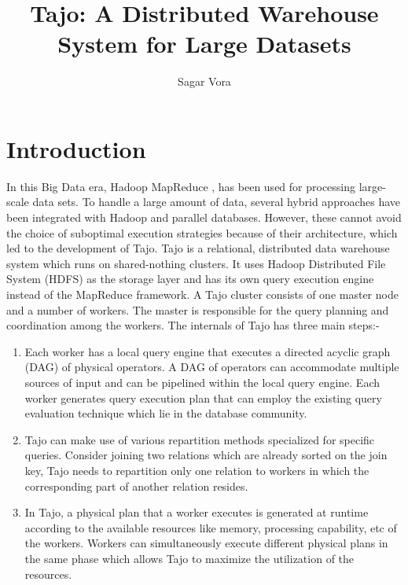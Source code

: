 \documentclass[9pt,twocolumn,twoside]{../../styles/osajnl}
\title{Tajo: A Distributed Warehouse System for Large Datasets}
\author[1]{Sagar Vora}
\affil[1]{School of Informatics and Computing, Bloomington, IN 47408, U.S.A.}
\begin{document}
\maketitle

\section{Introduction}
In this Big Data era, Hadoop \cite{www-apache-hadoop} MapReduce
\cite{mapreduce-article}, has been used for processing large-scale
data sets. To handle a large amount of data, several hybrid approaches
have been integrated with Hadoop and parallel databases. However,
these cannot avoid the choice of suboptimal execution strategies
because of their architecture, which led to the development of
Tajo. Tajo \cite{www-apache-tajo} is a relational, distributed data
warehouse system which runs on shared-nothing clusters. It uses Hadoop
Distributed File System (HDFS) as the storage layer and has its own
query execution engine instead of the MapReduce framework. A Tajo
cluster consists of one master node and a number of workers. The
master is responsible for the query planning and coordination among
the workers. \newline \newline The internals of Tajo has three main
steps:- \begin{enumerate} \item Each worker has a local query engine
  that executes a directed acyclic graph (DAG) of physical
  operators. A DAG of operators can accommodate multiple sources of
  input and can be pipelined within the local query engine. Each
  worker generates query execution plan that can employ the existing
  query evaluation technique \cite{query-evaluation-article}
  \cite{query-processing-article} which lie in the database
  community. \item Tajo can make use of various repartition methods
  specialized for specific queries. Consider joining two relations
  which are already sorted on the join key, Tajo needs to repartition
  only one relation to workers in which the corresponding part of
  another relation resides. \item In Tajo, a physical plan that a
  worker executes is generated at runtime according to the available
  resources like memory, processing capability, etc of the
  workers. Workers can simultaneously execute different physical plans
  in the same phase which allows Tajo to maximize the utilization of
  the resources. \end{enumerate}
\end{document}
